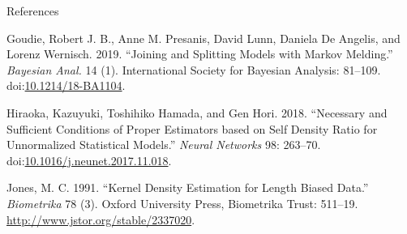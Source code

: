 \documentclass[10pt,ignorenonframetext,]{beamer}
\begin{document}
\begin{frame}{References}

\hypertarget{refs}{}
\hypertarget{ref-goudie:etal:18}{}
Goudie, Robert J. B., Anne M. Presanis, David Lunn, Daniela De Angelis,
and Lorenz Wernisch. 2019. ``Joining and Splitting Models with Markov
Melding.'' \emph{Bayesian Anal.} 14 (1). International Society for
Bayesian Analysis: 81--109.
doi:\href{https://doi.org/10.1214/18-BA1104}{10.1214/18-BA1104}.

\hypertarget{ref-hiraoka:hamada:hori:18}{}
Hiraoka, Kazuyuki, Toshihiko Hamada, and Gen Hori. 2018. ``Necessary and
Sufficient Conditions of Proper Estimators based on Self Density Ratio
for Unnormalized Statistical Models.'' \emph{Neural Networks} 98:
263--70.
doi:\href{https://doi.org/10.1016/j.neunet.2017.11.018}{10.1016/j.neunet.2017.11.018}.

\hypertarget{ref-jones:91}{}
Jones, M. C. 1991. ``Kernel Density Estimation for Length Biased Data.''
\emph{Biometrika} 78 (3). Oxford University Press, Biometrika Trust:
511--19. \url{http://www.jstor.org/stable/2337020}.

\end{frame}
\end{document}

